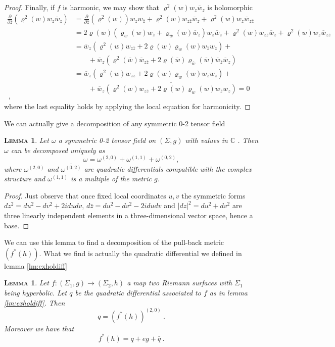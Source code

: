 \documentclass[a4paper,11pt,openright,twoside]{book}
\renewcommand{\rho}{\varrho}
\newcommand{\C}{\mathbb{C}}
\newcommand{\1}{\mathds{1}}
\theoremstyle{plain}
\newtheorem{lemma}[thm]{\textsc{Lemma}}
\theoremstyle{definition}
\theoremstyle{remark}
\begin{document}
\begin{proof}
	Finally, if $f$ is harmonic, we may show that $\rho^2(w) w_z\overline{w}_z $ is holomorphic
	\begin{align*}
		\frac{\partial  }{\partial \overline{z}} (\rho^2(w)w_z\overline{w}_z) &=
		\frac{\partial  }{\partial \overline{z}} (\rho^2(w)) w_z w_{\overline{z}} +\rho^2(w) w_{z\overline{z}} \overline{w}_z + \rho^2(w)w_z \overline{w}_{z\overline{z}}\\
		&= 2\rho(w)(\rho_w(w)w_{\overline{z}} +\rho_{\overline{w}}(w)\overline{w}_{\overline{z}})w_z\overline{w}_z+ \rho^2(w) w_{z\overline{z}} \overline{w}_z + \rho^2(w)w_z \overline{w}_{z\overline{z}}\\
		&= \overline{w}_z(\rho^2(w)w_{z\overline{z}}+2\rho(w) \rho_w(w)w_{\overline{z}}w_z)+\\
		&\qquad+ \overline{w}_z(\rho^2(\overline{w})\overline{w}_{z\overline{z}}+2\rho(\overline{w}) \rho_{\overline{w}}(\overline{w})\overline{w}_{\overline{z}}\overline{w}_z)\\
		&= \overline{w}_z(\rho^2(w)w_{z\overline{z}}+2\rho(w) \rho_w(w)w_{\overline{z}}w_z)+\\
		&\qquad+ \overline{w}_z\overline{(\rho^2(w)w_{z\overline{z}}+2\rho(w) \rho_w(w)w_{\overline{z}}w_z)} = 0\\
	\ , 
	\end{align*}
	where the last equality holds by applying the local equation for harmonicity.
\end{proof}
We can actually give a decomposition of any symmetric 0-2 tensor field
\begin{lemma}\label{lm:tfdec}
	Let $\omega$ a symmetric 0-2 tensor field on $(\Sigma,g)$ with values in  $\C$ . Then $\omega$ can be decomposed uniquely as
	\[\omega = \omega^{(2,0)}+\omega^{(1,1)}+\omega^{(0,2)},\] 
where $\omega^{(2,0)}$ and $\overline{\omega^{(0,2)}}$ are quadratic differentials compatible with the complex structure and $\omega^{(1,1)}$ is a multiple of the metric $g$. 
\end{lemma}
\begin{proof}
	Just observe that once fixed local coordinates $u,v$ the symmetric forms $dz^2 = du^2-dv^2+2idudv$, $d\bar z = du^2-dv^2-2idudv$ and $|dz|^2 = du^2+dv^2$ are three linearly independent elements in a three-dimensional vector space, hence a base. 
\end{proof}
We can use this lemma to find a decomposition of the pull-back metric $(f^*(h))$. What we find is actually the quadratic differential we defined in lemma \ref{lm:exholdiff}
\begin{lemma}
	Let $f:(\Sigma_1,g)\to (\Sigma_2,h) $ a map two Riemann surfaces with $\Sigma_1$ being hyperbolic. Let $q$ be the quadratic differential associated to $f$ as in lemma \ref{lm:exholdiff}. Then 
	\[q = (f^*(h))^{(2,0)}\ .\] 
	Moreover we have that
	\[ f^*(h) = q + eg +\bar q\ .\] 
\end{lemma}
\end{document}
